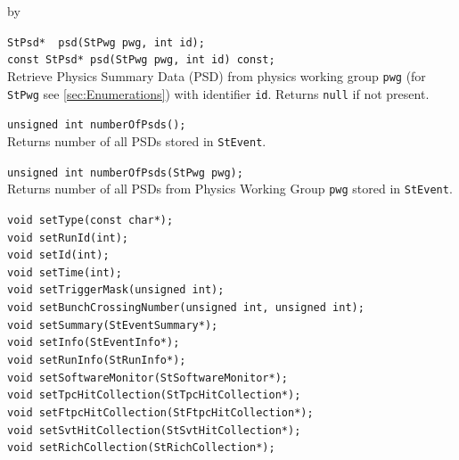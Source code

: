 \documentclass[twoside]{article}
\newcommand{\entrylabel}[1]{\mbox{\textbf{{#1}}}\hfil}%
\newenvironment{entry}
{\begin{list}{}%
    {\renewcommand{\makelabel}{\entrylabel}%
     \setlength{\labelwidth}{90pt}%
     \setlength{\leftmargin}{\labelwidth}
     \advance\leftmargin by \labelsep%
      }%
    }%
  {\end{list}}
\newcommand{\Entrylabel}[1]%
{\raisebox{0pt}[1ex][0pt]{\makebox[\labelwidth][l]%
    {\parbox[t]{\labelwidth}{\hspace{0pt}\textbf{{#1}}}}}}
\newenvironment{Entry}%
{\renewcommand{\entrylabel}{\Entrylabel}\begin{entry}}%
  {\end{entry}}
\begin{document}
\begin{Entry}
    \verb+StPsd*  psd(StPwg pwg, int id);+\\ 
    \verb+const StPsd* psd(StPwg pwg, int id) const;+\\
    Retrieve Physics Summary Data (PSD) from physics working group \texttt{pwg}
    (for \texttt{StPwg} see \ref{sec:Enumerations}) with identifier \texttt{id}.
    Returns \texttt{null} if not present.
        
    \verb+unsigned int numberOfPsds();+\\
    Returns number of all PSDs stored in \texttt{StEvent}.

    \verb+unsigned int numberOfPsds(StPwg pwg);+\\ 
    Returns number of all PSDs from Physics Working Group \texttt{pwg} stored in \texttt{StEvent}.

    \verb+void setType(const char*);+\\

    \verb+void setRunId(int);+\\

    \verb+void setId(int);+\\

    \verb+void setTime(int);+\\

    \verb+void setTriggerMask(unsigned int);+\\

    \verb+void setBunchCrossingNumber(unsigned int, unsigned int);+\\

    \verb+void setSummary(StEventSummary*);+\\

    \verb+void setInfo(StEventInfo*);+\\
    
    \verb+void setRunInfo(StRunInfo*);+\\

    \verb+void setSoftwareMonitor(StSoftwareMonitor*);+\\

    \verb+void setTpcHitCollection(StTpcHitCollection*);+\\

    \verb+void setFtpcHitCollection(StFtpcHitCollection*);+\\

    \verb+void setSvtHitCollection(StSvtHitCollection*);+\\

    \verb+void setRichCollection(StRichCollection*);+\\


\end{Entry}
\end{document}
